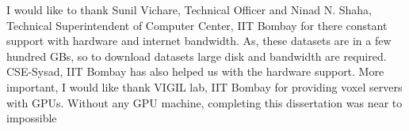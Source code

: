 \acknowledgments

I would like to thank Sunil Vichare, Technical Officer and Ninad N. Shaha, Technical Superintendent of Computer Center, IIT Bombay for there constant support with hardware and internet bandwidth.  As, these datasets are in a few hundred GBs, so to download datasets large disk and bandwidth are required. CSE-Sysad, IIT Bombay has also helped us with the hardware support. More important, I would like thank VIGIL lab, IIT Bombay for providing voxel servers with GPUs. Without any GPU machine, completing this dissertation was near to impossible       


\signature{\today}


